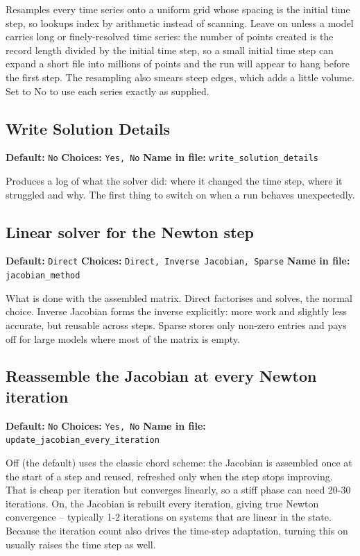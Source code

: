 \documentclass[11pt]{article}
\begin{document}
Resamples every time series onto a uniform grid whose spacing is the initial time step, so lookups index by arithmetic instead of scanning. Leave on unless a model carries long or finely-resolved time series: the number of points created is the record length divided by the initial time step, so a small initial time step can expand a short file into millions of points and the run will appear to hang before the first step. The resampling also smears steep edges, which adds a little volume. Set to No to use each series exactly as supplied.
\subsection{Write Solution Details}
{\small \textbf{Default:} \texttt{No} \quad\textbullet\quad \textbf{Choices:} \texttt{Yes, No} \quad\textbullet\quad \textbf{Name in file:} \texttt{write\_\allowbreak{}solution\_\allowbreak{}details}}

Produces a log of what the solver did: where it changed the time step, where it struggled and why. The first thing to switch on when a run behaves unexpectedly.
\subsection{Linear solver for the Newton step}
{\small \textbf{Default:} \texttt{Direct} \quad\textbullet\quad \textbf{Choices:} \texttt{Direct, Inverse Jacobian, Sparse} \quad\textbullet\quad \textbf{Name in file:} \texttt{jacobian\_\allowbreak{}method}}

What is done with the assembled matrix. Direct factorises and solves, the normal choice. Inverse Jacobian forms the inverse explicitly: more work and slightly less accurate, but reusable across steps. Sparse stores only non-zero entries and pays off for large models where most of the matrix is empty.
\subsection{Reassemble the Jacobian at every Newton iteration}
{\small \textbf{Default:} \texttt{No} \quad\textbullet\quad \textbf{Choices:} \texttt{Yes, No} \quad\textbullet\quad \textbf{Name in file:} \texttt{update\_\allowbreak{}jacobian\_\allowbreak{}every\_\allowbreak{}iteration}}

Off (the default) uses the classic chord scheme: the Jacobian is assembled once at the start of a step and reused, refreshed only when the step stops improving. That is cheap per iteration but converges linearly, so a stiff phase can need 20-30 iterations. On, the Jacobian is rebuilt every iteration, giving true Newton convergence -- typically 1-2 iterations on systems that are linear in the state. Because the iteration count also drives the time-step adaptation, turning this on usually raises the time step as well.
\end{document}
